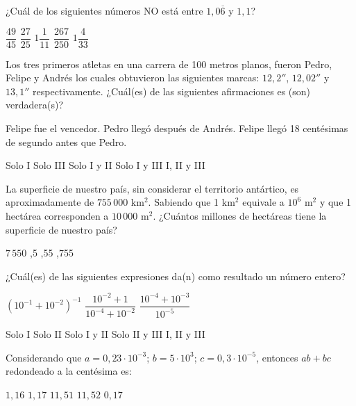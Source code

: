 \documentclass[pagina vacia]{srs}
\begin{document}
\begin{preguntas}[after-item-skip=1cm]
\pregunta ¿Cuál de los siguientes números NO está entre $1,0\overline{6}$ y $1,1$?
\begin{vertical}
\alternativa \( \dfrac{49}{45} \)
\alternativa \( \dfrac{27}{25} \)
\alternativa \( 1\dfrac{1}{11} \)
\alternativa \( \dfrac{267}{250} \)
\alternativa \( 1\dfrac{4}{33} \)
\end{vertical}

\pregunta Los tres primeros atletas en una carrera de 100 metros planos, fueron Pedro, Felipe y Andrés los cuales obtuvieron las siguientes marcas: \(12,2''\), \(12,02''\) y \(13,1''\) respectivamente. ¿Cuál(es) de las siguientes afirmaciones es (son) verdadera(s)?
\begin{verticali}
\alternativa Felipe fue el vencedor.
\alternativa Pedro llegó después de Andrés.
\alternativa Felipe llegó 18 centésimas de segundo antes que Pedro.
\end{verticali}
\begin{vertical}
\alternativa Solo I
\alternativa Solo III
\alternativa Solo I y II
\alternativa Solo I y III
\alternativa I, II y III
\end{vertical}

\pregunta La superficie de nuestro país, sin considerar el territorio antártico, es aproximadamente de \(755\,000\) km\(^2\). Sabiendo que 1 km\(^2\) equivale a \(10^6\) m\(^2\) y que 1 hectárea corresponden a \(10\,000\) m\(^2\). ¿Cuántos millones de hectáreas tiene la superficie de nuestro país?
\begin{vertical}
\alternativa \(7\,550\)
,5
,55
,755
\end{vertical}

\pregunta ¿Cuál(es) de las siguientes expresiones da(n) como resultado un número entero?
\begin{verticali}
\alternativa \( \left(10^{-1} + 10^{-2}\right)^{-1} \)
\alternativa \( \dfrac{10^{-2} + 1}{10^{-4} + 10^{-2}} \)
\alternativa \( \dfrac{10^{-4} + 10^{-3}}{10^{-5}} \)
\end{verticali}
\begin{vertical}
\alternativa Solo I
\alternativa Solo II
\alternativa Solo I y II
\alternativa Solo II y III
\alternativa I, II y III
\end{vertical}

\pregunta Considerando que \(a = 0,23 \cdot 10^{-3}\); \(b = 5 \cdot 10^3\); \(c = 0,3 \cdot 10^{-5}\), entonces $ab + bc$ redondeado a la centésima es:
\begin{vertical}
\alternativa $1,16$
\alternativa $1,17$
\alternativa $11,51$
\alternativa $11,52$
\alternativa $0,17$
\end{vertical}


\end{preguntas}
\end{document}
